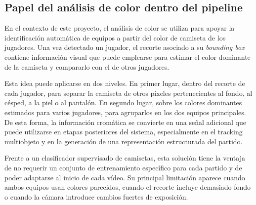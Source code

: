 \subsection{Papel del análisis de color dentro del pipeline}
En el contexto de este proyecto, el análisis de color se utiliza para apoyar la identificación automática de equipos a partir del color de camiseta de los jugadores. Una vez detectado un jugador, el recorte asociado a su \textit{bounding box} contiene información visual que puede emplearse para estimar el color dominante de la camiseta y compararlo con el de otros jugadores.

Esta idea puede aplicarse en dos niveles. En primer lugar, dentro del recorte de cada jugador, para separar la camiseta de otros píxeles pertenecientes al fondo, al césped, a la piel o al pantalón. En segundo lugar, sobre los colores dominantes estimados para varios jugadores, para agruparlos en los dos equipos principales. De esta forma, la información cromática se convierte en una señal adicional que puede utilizarse en etapas posteriores del sistema, especialmente en el tracking multiobjeto y en la generación de una representación estructurada del partido.

Frente a un clasificador supervisado de camisetas, esta solución tiene la ventaja de no requerir un conjunto de entrenamiento específico para cada partido y de poder adaptarse al inicio de cada vídeo. Su principal limitación aparece cuando ambos equipos usan colores parecidos, cuando el recorte incluye demasiado fondo o cuando la cámara introduce cambios fuertes de exposición.
